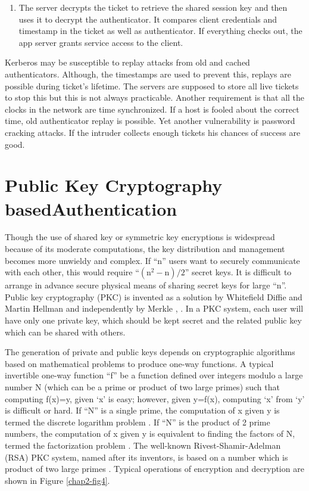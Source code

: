 \begin{multicols}{2}
\begin{enumerate}
\item The server decrypts the ticket to retrieve the shared session key and then uses it to decrypt the authenticator. It compares client credentials and timestamp in the ticket as well as authenticator. If everything checks out, the app server grants service access to the client.
\end{enumerate}

Kerberos may be susceptible to replay attacks from old and cached authenticators. Although, the timestamps are used to prevent this, replays are possible during ticket's lifetime. The servers are supposed to store all live tickets to stop this but this is not always practicable. Another requirement is that all the clocks in the network are time synchronized. If a host is fooled about the correct time, old authenticator replay is possible. Yet another vulnerability is password cracking attacks. If the intruder collects enough tickets his chances of success are good.\\[-25pt]

\section{Public Key Cryptography based\hfil\break Authentication}

\vskip -4pt

Though the use of shared key or symmetric key encryptions is widespread because of its moderate computations, the key distribution and management becomes more unwieldy and complex. If ``n'' users want to securely communicate with each other, this would require ``$(\text{n}^{2}-\text{n})/2$'' secret keys. It is difficult to arrange in advance secure physical means of sharing secret keys for large ``n''. Public key cryptography (PKC) is invented as a solution by Whitefield Diffie and Martin Hellman and independently by Merkle \cite{chap2-key1}, \cite{chap2-key13}. In a PKC system, each user will have only one private key, which should be kept secret and the related public key which can be shared with others.

The generation of private and public keys depends on cryptographic algorithms based on mathematical problems to produce one-way functions. A typical invertible one-way function ``f'' be a function defined over integers modulo a large number N (which can be a prime or product of two large primes) such that computing f(x)=y, given `x' is easy; however, given y=f(x), computing `x' from `y' is difficult or hard. If ``N'' is a single prime, the computation of x given y is termed the discrete logarithm problem \cite{chap2-key1}. If ``N'' is the product of 2 prime numbers, the computation of x given y is equivalent to finding the factors of N, termed the factorization problem \cite{chap2-key1}. The well-known Rivest-Shamir-Adelman (RSA) PKC system, named after its inventors, is based on a number which is product of two large primes \cite{chap2-key14}. Typical operations of encryption and decryption are shown in Figure \ref{chap2-fig4}. 


\end{multicols}
